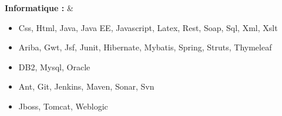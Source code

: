 \textbf{Informatique :}
& \begin{itemize}
    \item Css, Html, Java, Java EE, Javascript, Latex, Rest, Soap, Sql, Xml, Xslt
    \item Ariba, Gwt, Jsf, Junit, Hibernate, Mybatis, Spring, Struts, Thymeleaf
    \item DB2, Mysql, Oracle
    \item Ant, Git, Jenkins, Maven, Sonar, Svn 
    \item Jboss, Tomcat, Weblogic
\end{itemize} \\
